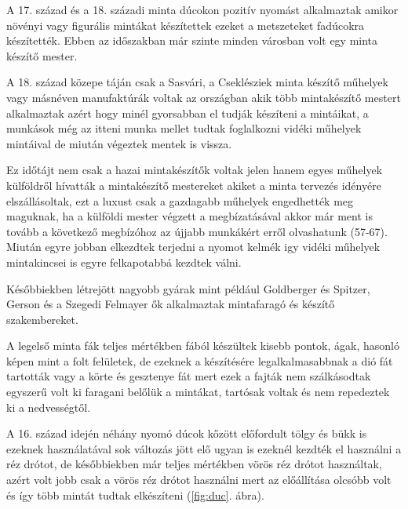 \documentclass[fontsize=12pt, appendixprefix=true]{scrreprt}
\begin{document}
A 17. század és a 18. századi minta dúcokon pozitív nyomást alkalmaztak amikor növényi vagy figurális mintákat készítettek ezeket a metszeteket fadúcokra készítették. Ebben az időszakban már szinte minden városban volt egy minta készítő mester.

A 18. század közepe táján csak a Sasvári, a Cseklésziek minta készítő műhelyek vagy másnéven manufaktúrák  voltak az országban akik több mintakészítő mestert alkalmaztak azért hogy minél gyorsabban el tudják készíteni a mintáikat, a munkások még az itteni munka mellet tudtak foglalkozni vidéki műhelyek mintáival de miután végeztek mentek is vissza. 

Ez időtájt nem csak a hazai mintakészítők voltak jelen hanem egyes műhelyek külföldről hívatták a mintakészítő mestereket akiket a minta tervezés idényére elszállásoltak, ezt a luxust csak a gazdagabb műhelyek engedhették meg maguknak, ha a külföldi mester végzett a megbízatásával akkor már ment is tovább a következő megbízóhoz az újjabb munkákért erről olvashatunk \cite{domonkos1981magyarorszagi} (57-67).
Miután egyre jobban elkezdtek terjedni a nyomot kelmék igy vidéki műhelyek mintakincsei is egyre felkapotabbá kezdtek válni.

Későbbiekben létrejött nagyobb gyárak mint például Goldberger és Spitzer, Gerson és a Szegedi Felmayer ők alkalmaztak mintafaragó és készítő szakembereket.

A legelső minta fák teljes mértékben fából készültek kisebb pontok, ágak, hasonló képen mint a folt felületek, de ezeknek a készítésére legalkalmasabbnak a dió fát tartották vagy a körte és gesztenye fát mert ezek a fajták nem szálkásodtak egyszerű volt ki faragani belőlük a mintákat, tartósak voltak és nem repedeztek ki a nedvességtől.

A 16. század idején néhány nyomó dúcok kőzött előfordult tölgy és bükk is ezeknek használatával sok változás jött elő ugyan is ezeknél kezdték el használni a réz drótot, de későbbiekben már teljes mértékben vörös réz drótot használtak, azért volt jobb csak a vörös réz drótot használni mert az előállítása olcsóbb volt és így több mintát tudtak elkészíteni (\ref{fig:duc}. ábra).
\end{document}
